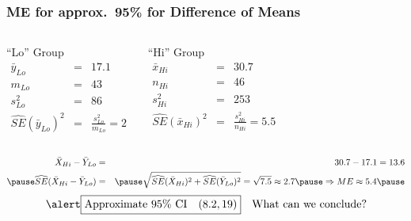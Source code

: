 \begin{frame}
\frametitle{ME for approx.\ 95\% for Difference of Means}

\small
\singlespacing
\begin{columns} 
	\begin{block}{``Lo'' Group}
		\begin{eqnarray*}
			\bar{y}_{Lo} &=&17.1 \\
			m_{Lo} &=& 43\\  
			s^2_{Lo} &=& 86\\ 
			\widehat{SE}(\bar{y}_{Lo})^2 &=& \frac{s^2_{Lo}}{m_{Lo}} = 2
		\end{eqnarray*}
	\end{block}
	
		\begin{block}{``Hi'' Group}
		\begin{eqnarray*}
			\bar{x}_{Hi} &=& 30.7\\
			n_{Hi} &=& 46\\  
			s^2_{Hi} &=& 253\\
			\widehat{SE}(\bar{x}_{Hi})^2 &=& \frac{s^2_{Hi}}{n_{Hi}} = 5.5
		\end{eqnarray*}
	\end{block}
\end{columns}

\pause
	\begin{eqnarray*}
		\bar{X}_{Hi} - \bar{Y}_{Lo} &=& 30.7 - 17.1 =  13.6\\ \pause
		\widehat{SE}(\bar{X}_{Hi} - \bar{Y}_{Lo}) &=& \pause \sqrt{\widehat{SE}(\bar{X}_{Hi})^2 + \widehat{SE}(\bar{Y}_{Lo})^2} = \sqrt{7.5}  \approx 2.7 \pause \Rightarrow ME \approx 5.4 \pause 
	\end{eqnarray*}
	$$\alert{\boxed{\mbox{Approximate 95\% CI} \quad (8.2, 19)}} \quad \mbox{What can we conclude?}$$


\end{frame}

